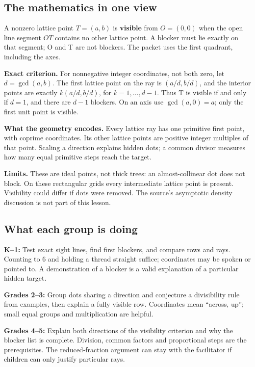 \subsection*{The mathematics in one view}
A nonzero lattice point $T=(a,b)$ is \textbf{visible} from $O=(0,0)$ when the open line segment $OT$ contains no other lattice point. A blocker must lie exactly on that segment; O and T are not blockers. The packet uses the first quadrant, including the axes.

\textbf{Exact criterion.} For nonnegative integer coordinates, not both zero, let $d=\gcd(a,b)$. The first lattice point on the ray is $(a/d,b/d)$, and the interior points are exactly $k(a/d,b/d)$, for $k=1,\dots,d-1$. Thus T is visible if and only if $d=1$, and there are $d-1$ blockers. On an axis use $\gcd(a,0)=a$; only the first unit point is visible.

\textbf{What the geometry encodes.} Every lattice ray has one primitive first point, with coprime coordinates. Its other lattice points are positive integer multiples of that point. Scaling a direction explains hidden dots; a common divisor measures how many equal primitive steps reach the target.

\textbf{Limits.} These are ideal points, not thick trees: an almost-collinear dot does not block. On these rectangular grids every intermediate lattice point is present. Visibility could differ if dots were removed. The source's asymptotic density discussion is not part of this lesson.

\subsection*{What each group is doing}
\textbf{K--1:} Test exact sight lines, find first blockers, and compare rows and rays. Counting to 6 and holding a thread straight suffice; coordinates may be spoken or pointed to. A demonstration of a blocker is a valid explanation of a particular hidden target.

\textbf{Grades 2--3:} Group dots sharing a direction and conjecture a divisibility rule from examples, then explain a fully visible row. Coordinates mean ``across, up''; small equal groups and multiplication are helpful.

\textbf{Grades 4--5:} Explain both directions of the visibility criterion and why the blocker list is complete. Division, common factors and proportional steps are the prerequisites. The reduced-fraction argument can stay with the facilitator if children can only justify particular rays.
